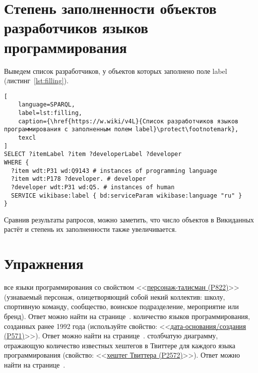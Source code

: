 \section{Степень заполненности объектов разработчиков языков программирования}
Выведем список разработчиков, у объектов которых заполнено поле label (листинг~\ref{lst:filling}).

\begin{lstlisting}[
	language=SPARQL,
	label=lst:filling,
	caption={\href{https://w.wiki/v4L}{Список разработчиков языков программирования с заполненным полем label}\protect\footnotemark},
	texcl
]
SELECT ?itemLabel ?item ?developerLabel ?developer
WHERE {
  ?item wdt:P31 wd:Q9143 # instances of programming language
  ?item wdt:P178 ?developer. # developer 
  ?developer wdt:P31 wd:Q5. # instances of human
  SERVICE wikibase:label { bd:serviceParam wikibase:language "ru" }
}
\end{lstlisting}
Сравнив результаты рапросов, можно заметить, что число объектов в Викиданных растёт и степень их заполненности также увеличивается.

\section{Упражнения}
\label{prog_lang_test}
\begin{enumerate}
	 все языки программирования со свойством <<\href{https://www.wikidata.org/wiki/Property:P822}{персонаж-талисман (P822)}>> (узнаваемый персонаж, олицетворяющий собой некий коллектив: школу, спортивную команду, сообщество, воинское подразделение, мероприятие или бренд).
Ответ можно найти на странице~\pageref{answer:prog_langs_4}.
	 количество языков программирования, созданных ранее 1992 года (используйте свойство: <<\href{https://www.wikidata.org/wiki/Property:P571}{дата-основания/создания (P571)}>>).
Ответ можно найти на странице~\pageref{answer:prog_langs_4}.
	 столбчатую диаграмму, отражающую количество известных хештегов в Твиттере для каждого языка программирования (свойство: <<\href{https://www.wikidata.org/wiki/Property:P2572}{хештег Твиттера (P2572)}>>).
Ответ можно найти на странице~\pageref{answer:prog_langs_4}.
\end{enumerate}